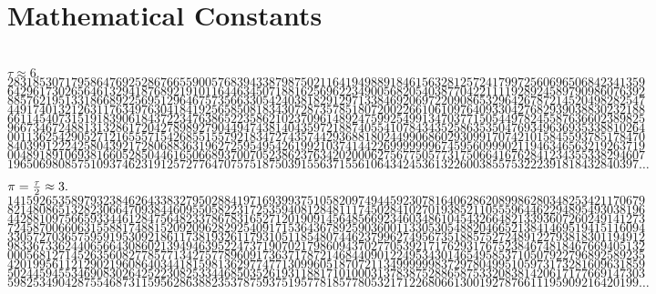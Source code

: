 \documentclass{tufte-book}
\begin{document}
\newpage
\enlargethispage{4\baselineskip}
\section{Mathematical Constants}
~\\
$\tau\approx6.$\\
$2831853071795864769252867665590057683943387987502116419498891846156328125724179972560696506842341359$\\
$6429617302656461329418768921910116446345071881625696223490056820540387704221111928924589790986076392$\\
$8857621951331866892256951296467573566330542403818291297133846920697220908653296426787214520498282547$\\
$4491740132126311763497630418419256585081834307287357851807200226610610976409330427682939038830232188$\\
$6611454073151918390618437223476386522358621023709614892475992549913470377150544978245587636602389825$\\
$9667346724881313286172042789892790449474381404359721887405541078434352586353504769349636935338810264$\\
$0011362542905271216555715426855155792183472743574429368818024499068602930991707421015845593785178470$\\
$8403991222425804392172806883631962725954954261992103741442269999999674595609990211946346563219263719$\\
$0048918910693816605285044616506689370070523862376342020006275677505773175066416762841234355338294607$\\
$196506980857510937462319125727764707575187503915563715561064342453613226003855753222391818432840397\dots$

\vspace{.3\baselineskip}$\pi={\tau\over 2}\approx3.$\\
$1415926535897932384626433832795028841971693993751058209749445923078164062862089986280348253421170679$\\
$8214808651328230664709384460955058223172535940812848111745028410270193852110555964462294895493038196$\\
$4428810975665933446128475648233786783165271201909145648566923460348610454326648213393607260249141273$\\
$7245870066063155881748815209209628292540917153643678925903600113305305488204665213841469519415116094$\\
$3305727036575959195309218611738193261179310511854807446237996274956735188575272489122793818301194912$\\
$9833673362440656643086021394946395224737190702179860943702770539217176293176752384674818467669405132$\\
$0005681271452635608277857713427577896091736371787214684409012249534301465495853710507922796892589235$\\
$4201995611212902196086403441815981362977477130996051870721134999999837297804995105973173281609631859$\\
$5024459455346908302642522308253344685035261931188171010003137838752886587533208381420617177669147303$\\
$598253490428755468731159562863882353787593751957781857780532171226806613001927876611195909216420199\dots$
\end{document}
